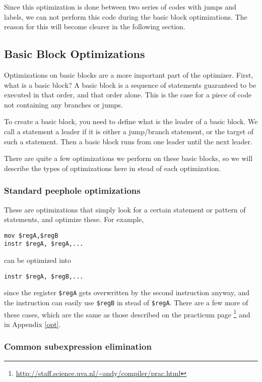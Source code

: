 \documentclass[10pt,a4paper]{article}
\begin{document}
Since this optimization is done between two series of codes with jumps and
labels, we can not perform this code during the basic block optimizations. The
reason for this will become clearer in the following section.

\subsection{Basic Block Optimizations}

Optimizations on basic blocks are a more important part of the optimizer.
First, what is a basic block? A basic block is a sequence of statements
guaranteed to be executed in that order, and that order alone. This is the case
for a piece of code not containing any branches or jumps.

To create a basic block, you need to define what is the leader of a basic
block. We call a statement a leader if it is either a jump/branch statement, or
the target of such a statement. Then a basic block runs from one leader until
the next leader.

There are quite a few optimizations we perform on these basic blocks, so we
will describe the types of optimizations here in stead of each optimization.

\subsubsection*{Standard peephole optimizations}

These are optimizations that simply look for a certain statement or pattern of
statements, and optimize these. For example,
\begin{verbatim}
mov $regA,$regB
instr $regA, $regA,... 
\end{verbatim}
can be optimized into
\begin{verbatim}
instr $regA, $regB,...
\end{verbatim}
since the register \texttt{\$regA} gets overwritten by the second instruction
anyway, and the instruction can easily use \texttt{\$regB} in stead of
\texttt{\$regA}. There are a few more of these cases, which are the same as
those described on the practicum page
\footnote{\url{http://staff.science.uva.nl/~andy/compiler/prac.html}} and in
Appendix \ref{opt}.

\subsubsection*{Common subexpression elimination}
\end{document}
